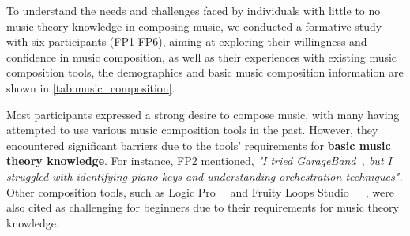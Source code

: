 To understand the needs and challenges faced by individuals with little to no music theory knowledge in composing music, we conducted a formative study with six participants (FP1-FP6), aiming at exploring their willingness and confidence in music composition, as well as their experiences with existing music composition tools, the demographics and basic music composition information are shown in \ref{tab:music_composition}.
\begin{table}[h]
\centering
{}
\caption{Music Composition Profile of Participants}
\label{tab:music_composition}
\end{table}

Most participants expressed a strong desire to compose music, with many having attempted to use various music composition tools in the past. However, they encountered significant barriers due to the tools' requirements for \textbf{basic music theory knowledge}. For instance, FP2 mentioned, \textit{"I tried GarageBand~\cite{r1}, but I struggled with identifying piano keys and understanding orchestration techniques".} Other composition tools, such as Logic Pro~\cite{r2} ~\cite{r4}and Fruity Loops Studio~~\cite{r3}~\cite{r5}, were also cited as challenging for beginners due to their requirements for music theory knowledge.

